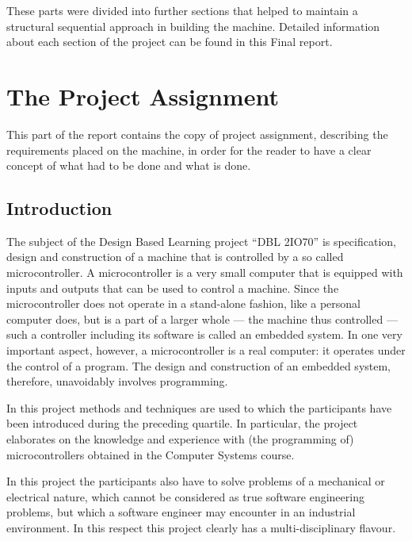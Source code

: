 \documentclass[a4paper,oneside,11pt]{report}
\begin{document}
These parts were divided into further sections that helped to maintain a structural sequential approach in building the machine. Detailed information about each section of the project can be found in this Final report.

\chapter{The Project Assignment}
This part of the report contains the copy of project assignment, describing the requirements placed on the machine, in order for the reader to have a clear concept of what had to be done and what is done.

\section{Introduction}
The subject of the Design Based Learning project “DBL 2IO70” is specification, design and construction of a machine that is controlled by a so called microcontroller. A microcontroller is a very small computer that is equipped with inputs and outputs that can be used to control a machine. Since the microcontroller does not operate in a stand-alone fashion, like a personal computer does, but is a part of a larger whole --- the machine thus controlled --- such a controller including its software is called an embedded system. In one very important aspect, however, a microcontroller is a real computer: it operates under the control of a program. The design and construction of an embedded system, therefore, unavoidably involves programming.

In this project methods and techniques are used to which the participants have been introduced during the preceding quartile. In particular, the project elaborates on the knowledge and experience with (the programming of) microcontrollers obtained in the Computer Systems course.

In this project the participants also have to solve problems of a mechanical or electrical nature, which cannot be considered as true software engineering problems, but which a software engineer may encounter in an industrial environment. In this respect this project clearly has a multi-disciplinary flavour.
\end{document}
